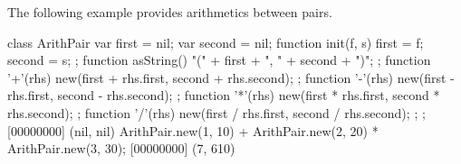 The following example provides arithmetics between pairs.

\begin{urbiscript}[firstnumber=last]
class ArithPair
{
  var first = nil;
  var second = nil;
  function init(f, s) { first = f;   second = s;  };
  function asString() { "(" + first + ", " + second + ")"; };
  function '+'(rhs) { new(first + rhs.first, second + rhs.second); };
  function '-'(rhs) { new(first - rhs.first, second - rhs.second); };
  function '*'(rhs) { new(first * rhs.first, second * rhs.second); };
  function '/'(rhs) { new(first / rhs.first, second / rhs.second); };
};
[00000000] (nil, nil)
ArithPair.new(1, 10) + ArithPair.new(2, 20) * ArithPair.new(3, 30);
[00000000] (7, 610)
\end{urbiscript}



